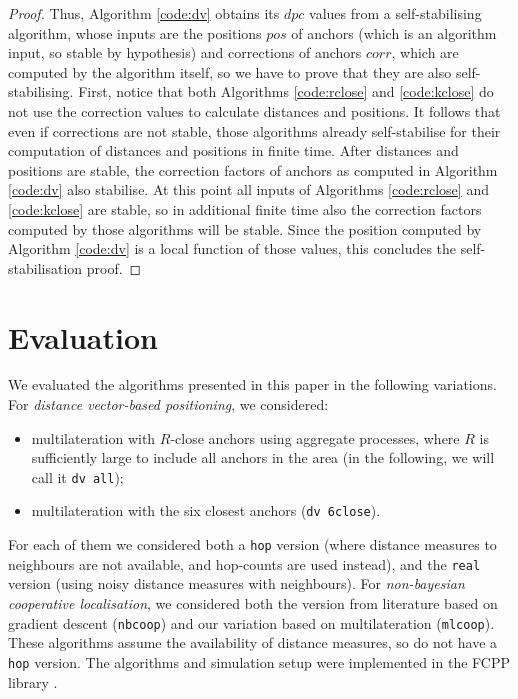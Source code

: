 \documentclass[runningheads]{llncs}
\begin{document}
\begin{proof}
    Thus, Algorithm \ref{code:dv} obtains its $\mathit{dpc}$ values from a self-stabilising algorithm, whose inputs are the positions $\mathit{pos}$ of anchors (which is an algorithm input, so stable by hypothesis) and corrections of anchors $\mathit{corr}$, which are computed by the algorithm itself, so we have to prove that they are also self-stabilising. First, notice that both Algorithms \ref{code:rclose} and \ref{code:kclose} do not use the correction values to calculate distances and positions. It follows that even if corrections are not stable, those algorithms already self-stabilise for their computation of distances and positions in finite time. After distances and positions are stable, the correction factors of anchors as computed in Algorithm \ref{code:dv} also stabilise. At this point all inputs of Algorithms \ref{code:rclose} and \ref{code:kclose} are stable, so in additional finite time also the correction factors computed by those algorithms will be stable. Since the position computed by Algorithm \ref{code:dv} is a local function of those values, this concludes the self-stabilisation proof.
\end{proof}

\section{Evaluation} \label{sec:evaluation}

We evaluated the algorithms presented in this paper in the following variations. For \emph{distance vector-based positioning}, we considered:
\begin{itemize}
    \item multilateration with $R$-close anchors using aggregate processes, where $R$ is sufficiently large to include all anchors in the area (in the following, we will call it \texttt{dv all});
    \item multilateration with the six closest anchors (\texttt{dv 6close}).
\end{itemize}
For each of them we considered both a \texttt{hop} version (where distance measures to neighbours are not available, and hop-counts are used instead), and the \texttt{real} version (using noisy distance measures with neighbours). For \emph{non-bayesian cooperative localisation}, we considered both the version from literature based on gradient descent (\texttt{nbcoop}) and our variation based on multilateration (\texttt{mlcoop}). These algorithms assume the availability of distance measures, so do not have a \texttt{hop} version. The algorithms and simulation setup were implemented in the FCPP library \cite{DBLP:journals/scp/AudritoT24}.
\end{document}
